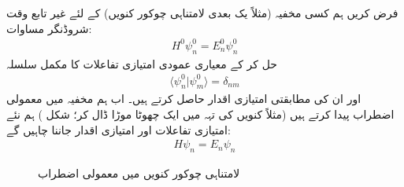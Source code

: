 

فرض کریں ہم کسی مخفیہ (مثلاً   یک  بعدی لامتناہی چوکور کنویں) کے لئے غیر تابع وقت شروڈنگر مساوات:
\begin{align}\label{مساوات_اضطراب_پہلی}
H^0\psi_n^0=E_n^0\psi_n^0
\end{align}
حل کر کے معیاری عمودی امتیازی تفاعلات  کا مکمل سلسلہ
\begin{align}
\langle \psi_n^0 | \psi_m^0 \rangle = \delta_{nm}
\end{align}
اور ان کی مطابقتی امتیازی اقدار  حاصل کرتے ہیں۔ اب ہم مخفیہ میں معمولی اضطراب پیدا کرتے ہیں (مثلاً کنویں کی تہہ میں ایک چھوٹا موڑا ڈال کر؛  شکل ) ہم  نئے  امتیازی تفاعلات اور امتیازی اقدار جاننا چاہیں گے: 
\begin{align}\label{مساوات_اضطراب_بنیادی}
H\psi_n = E_n\psi_n
\end{align}

\begin{figure}
\centering
{}
\caption{لامتناہی چوکور کنویں میں معمولی اضطراب}
\label{شکل_غیر_تابع_اضطراب_چکور_معمولی}
\end{figure}

